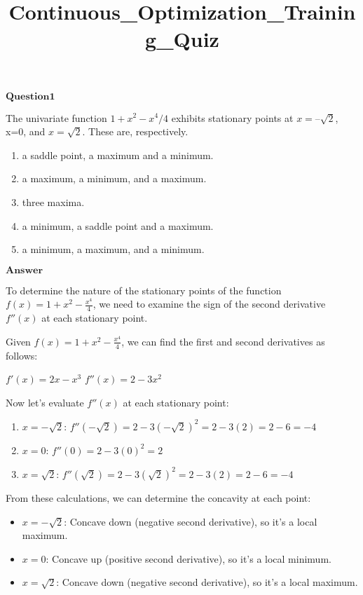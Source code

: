 \documentclass[11pt]{article}
\title{Continuous\_Optimization\_Training\_Quiz}
\providecommand{\tightlist}{%
      \setlength{\itemsep}{0pt}\setlength{\parskip}{0pt}}
\begin{document}
    
    \maketitle
	
    $\textbf{Question1}$

The univariate function $1+x^2-x^4/4$ exhibits stationary points at
$x=–\sqrt{2}$, x=0, and $x=\sqrt{2}$. These are, respectively.

\begin{enumerate}
\def\labelenumi{\alph{enumi}.}
\item
  a saddle point, a maximum and a minimum.
\item
  a maximum, a minimum, and a maximum.
\item
  three maxima.
\item
  a minimum, a saddle point and a maximum.
\item
  a minimum, a maximum, and a minimum.
\end{enumerate}

$\textbf{Answer}$

    To determine the nature of the stationary points of the function
$f(x) = 1 + x^2 - \frac{x^4}{4}$, we need to examine the sign of the
second derivative $f''(x)$ at each stationary point.

Given $f(x) = 1 + x^2 - \frac{x^4}{4}$, we can find the first and
second derivatives as follows:

$f'(x) = 2x - x^3$ $f''(x) = 2 - 3x^2$

Now let's evaluate $f''(x)$ at each stationary point:

\begin{enumerate}
\def\labelenumi{\arabic{enumi}.}
\tightlist
\item
  $x = -\sqrt{2}$:
  $f''(-\sqrt{2}) = 2 - 3(-\sqrt{2})^2 = 2 - 3(2) = 2 - 6 = -4$
\item
  $x = 0$: $f''(0) = 2 - 3(0)^2 = 2$
\item
  $x = \sqrt{2}$:
  $f''(\sqrt{2}) = 2 - 3(\sqrt{2})^2 = 2 - 3(2) = 2 - 6 = -4$
\end{enumerate}

From these calculations, we can determine the concavity at each point:

\begin{itemize}
\tightlist
\item
  $x = -\sqrt{2}$: Concave down (negative second derivative), so it's
  a local maximum.
\item
  $x = 0$: Concave up (positive second derivative), so it's a local
  minimum.
\item
  $x = \sqrt{2}$: Concave down (negative second derivative), so it's a
  local maximum.
\end{itemize}
\end{document}

